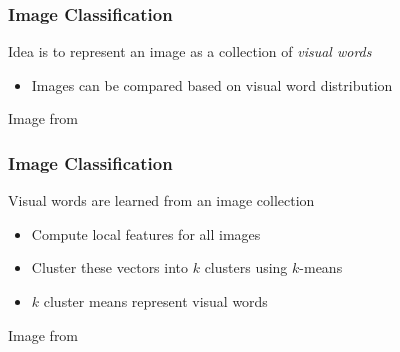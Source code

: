 \documentclass[xetex,professionalfont]{beamer}
\begin{document}

\begin{frame}
\frametitle{Image Classification}

Idea is to represent an image as a collection of \emph{visual words} %
\begin{itemize}
    \item Images can be compared based on visual word distribution
\end{itemize}

\medskip
\begin{center}
    {\centering Image from \cite{prince12}}
\end{center}

\end{frame}


\begin{frame}
\frametitle{Image Classification}

Visual words are learned from an image collection
\begin{itemize}
    \item Compute local features for all images
    \item Cluster these vectors into $k$ clusters using $k$-means
    \item $k$ cluster means represent visual words
\end{itemize}

\begin{center}
    {\centering Image from \cite{grauman2011}}
\end{center}

\end{frame}
\end{document}
